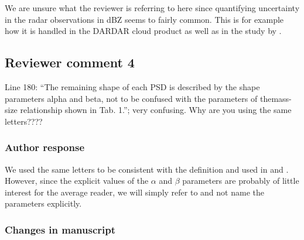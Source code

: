 We are unsure what the reviewer is referring to here since quantifying
uncertainty in the radar observations in dBZ seems to fairly common. This is for
example how it is handled in the DARDAR cloud \citep{delanoe10} product as well
as in the study by \citet{jiang19}.

\subsection*{Reviewer comment 4}

Line 180: “The remaining shape of each PSD is described by the shape parameters
alpha and beta, not to be confused with the parameters of themass-size
relationship shown in Tab. 1.”; very confusing. Why are you using the
same letters????

\subsubsection*{Author response}

We used the same letters to be consistent with the definition and used in
\cite{delanoe14} and \cite{cazenave19}. However, since the explicit values of
the $\alpha$ and $\beta$ parameters are probably of little interest for the
average reader, we will simply refer to \cite{cazenave19} and not name the
parameters explicitly.

\subsubsection*{Changes in manuscript}

